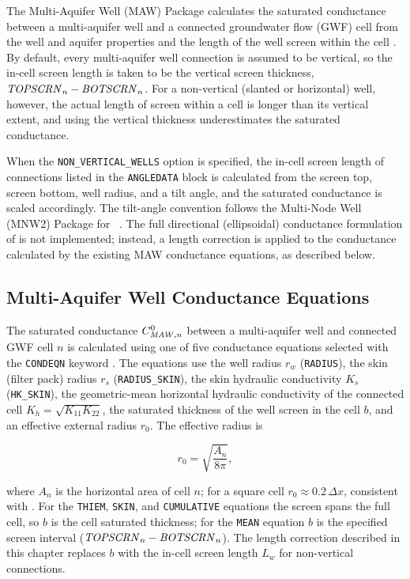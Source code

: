 The Multi-Aquifer Well (MAW) Package calculates the saturated conductance between a multi-aquifer well and a connected groundwater flow (GWF) cell from the well and aquifer properties and the length of the well screen within the cell \citep[\S 7]{modflow6gwf}. By default, every multi-aquifer well connection is assumed to be vertical, so the in-cell screen length is taken to be the vertical screen thickness, $\mathit{TOPSCRN}_n - \mathit{BOTSCRN}_n$. For a non-vertical (slanted or horizontal) well, however, the actual length of screen within a cell is longer than its vertical extent, and using the vertical thickness underestimates the saturated conductance.

When the \texttt{NON\_VERTICAL\_WELLS} option is specified, the in-cell screen length of connections listed in the \texttt{ANGLEDATA} block is calculated from the screen top, screen bottom, well radius, and a tilt angle, and the saturated conductance is scaled accordingly. The tilt-angle convention follows the Multi-Node Well (MNW2) Package for \mf~\citep{konikow2009}. The full directional (ellipsoidal) conductance formulation of \cite{konikow2009} is not implemented; instead, a length correction is applied to the conductance calculated by the existing MAW conductance equations, as described below.

\subsection{Multi-Aquifer Well Conductance Equations}

The saturated conductance $C^0_{\mathit{MAW},n}$ between a multi-aquifer well and connected GWF cell $n$ is calculated using one of five conductance equations selected with the \texttt{CONDEQN} keyword \citep[\S 7]{modflow6gwf}. The equations use the well radius $r_w$ (\texttt{RADIUS}), the skin (filter pack) radius $r_s$ (\texttt{RADIUS\_SKIN}), the skin hydraulic conductivity $K_s$ (\texttt{HK\_SKIN}), the geometric-mean horizontal hydraulic conductivity of the connected cell $K_h = \sqrt{K_{11} K_{22}}$, the saturated thickness of the well screen in the cell $b$, and an effective external radius $r_0$. The effective radius is

\begin{equation}
	\label{eqn:mawnv-r0}
	r_0 = \sqrt{\frac{A_n}{8 \pi}},
\end{equation}

\noindent where $A_n$ is the horizontal area of cell $n$; for a square cell $r_0 \approx 0.2 \, \Delta x$, consistent with \cite{peaceman1983}. For the \texttt{THIEM}, \texttt{SKIN}, and \texttt{CUMULATIVE} equations the screen spans the full cell, so $b$ is the cell saturated thickness; for the \texttt{MEAN} equation $b$ is the specified screen interval ($\mathit{TOPSCRN}_n - \mathit{BOTSCRN}_n$). The length correction described in this chapter replaces $b$ with the in-cell screen length $L_w$ for non-vertical connections.

